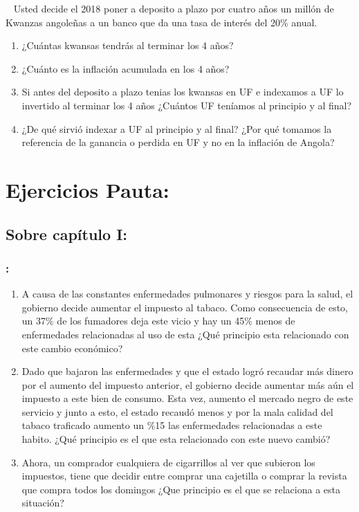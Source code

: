 \documentclass[
  letterpaper,
  DIV=11,
  numbers=noendperiod]{scrreport}
\providecommand{\tightlist}{%
  \setlength{\itemsep}{0pt}\setlength{\parskip}{0pt}}\usepackage{longtable,booktabs,array}
\begin{document}
~ Usted decide el 2018 poner a deposito a plazo por cuatro años un
millón de Kwanzas angoleñas a un banco que da una tasa de interés del
20\% anual.

\begin{enumerate}
\def\labelenumi{\arabic{enumi})}
\item
  ¿Cuántas kwansas tendrás al terminar los 4 años?
\item
  ¿Cuánto es la inflación acumulada en los 4 años?
\item
  Si antes del deposito a plazo tenias los kwansas en UF e indexamos a
  UF lo invertido al terminar los 4 años ¿Cuántos UF teníamos al
  principio y al final?
\item
  ¿De qué sirvió indexar a UF al principio y al final? ¿Por qué tomamos
  la referencia de la ganancia o perdida en UF y no en la inflación de
  Angola?
\end{enumerate}


\hypertarget{ejercicios-pauta}{%
\chapter{Ejercicios Pauta:}\label{ejercicios-pauta}}

\hypertarget{sobre-capuxedtulo-i-1}{%
\section{Sobre capítulo I:}\label{sobre-capuxedtulo-i-1}}

\hypertarget{section-21}{%
\subsection{:}\label{section-21}}

\begin{enumerate}
\def\labelenumi{\arabic{enumi})}
\tightlist
\item
  A causa de las constantes enfermedades pulmonares y riesgos para la
  salud, el gobierno decide aumentar el impuesto al tabaco. Como
  consecuencia de esto, un 37\% de los fumadores deja este vicio y hay
  un 45\% menos de enfermedades relacionadas al uso de esta ¿Qué
  principio esta relacionado con este cambio económico?
\item
  Dado que bajaron las enfermedades y que el estado logró recaudar más
  dinero por el aumento del impuesto anterior, el gobierno decide
  aumentar más aún el impuesto a este bien de consumo. Esta vez, aumento
  el mercado negro de este servicio y junto a esto, el estado recaudó
  menos y por la mala calidad del tabaco traficado aumento un \%15 las
  enfermedades relacionadas a este habito. ¿Qué principio es el que esta
  relacionado con este nuevo cambió?
\item
  Ahora, un comprador cualquiera de cigarrillos al ver que subieron los
  impuestos, tiene que decidir entre comprar una cajetilla o comprar la
  revista que compra todos los domingos ¿Que principio es el que se
  relaciona a esta situación?
\end{enumerate}
\end{document}
